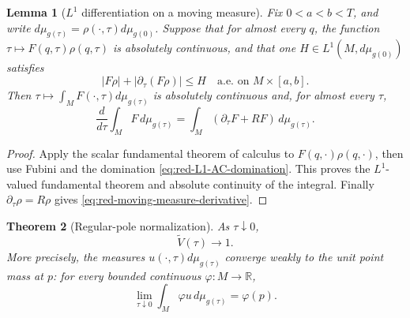 \documentclass[10pt]{coll-l}
\newtheorem{theorem}{Theorem}[chapter]
\newtheorem{lemma}[theorem]{Lemma}
\theoremstyle{definition}
\theoremstyle{remark}
\numberwithin{section}{chapter}
\numberwithin{equation}{chapter}
\begin{document}
\begin{lemma}[$L^1$ differentiation on a moving measure]
\label{lem:red-L1-moving-measure}
Fix $0<a<b<T$, and write
$d\mu_{g(\tau)}=\rho(\cdot,\tau)d\mu_{g(0)}$.  Suppose that for almost every
$q$, the function $\tau\mapsto F(q,\tau)\rho(q,\tau)$ is absolutely
continuous, and that one $H\in L^1(M,d\mu_{g(0)})$ satisfies
\begin{equation}
 |F\rho|+|\partial_\tau(F\rho)|\leq H
       \quad\text{a.e. on }M\times[a,b].               \label{eq:red-L1-AC-domination}
\end{equation}
Then $\tau\mapsto\int_MF(\cdot,\tau)d\mu_{g(\tau)}$ is absolutely continuous
and, for almost every $\tau$,
\begin{equation}
 \frac d{d\tau}\int_MF\,d\mu_{g(\tau)}
       =\int_M(\partial_\tau F+RF)\,d\mu_{g(\tau)}.    \label{eq:red-moving-measure-derivative}
\end{equation}
\end{lemma}

\begin{proof}
Apply the scalar fundamental theorem of calculus to $F(q,\cdot)\rho(q,\cdot)$,
then use Fubini and the domination
\eqref{eq:red-L1-AC-domination}.  This proves the $L^1$-valued fundamental
theorem and absolute continuity of the integral.  Finally
$\partial_\tau\rho=R\rho$ gives
\eqref{eq:red-moving-measure-derivative}.
\end{proof}

\begin{theorem}[Regular-pole normalization]
\label{thm:red-volume-normalization}
As $\tau\downarrow0$,
\begin{equation}
                         \widetilde V(\tau)\longrightarrow1.
                                                               \label{eq:red-volume-normalization}
\end{equation}
More precisely, the measures $u(\cdot,\tau)d\mu_{g(\tau)}$ converge weakly
to the unit point mass at $p$: for every bounded continuous
$\varphi:M\to\mathbb R$,
\begin{equation}
 \lim_{\tau\downarrow0}\int_M\varphi u\,d\mu_{g(\tau)}
                         =\varphi(p).                    \label{eq:red-density-delta-limit}
\end{equation}
\end{theorem}
\end{document}
